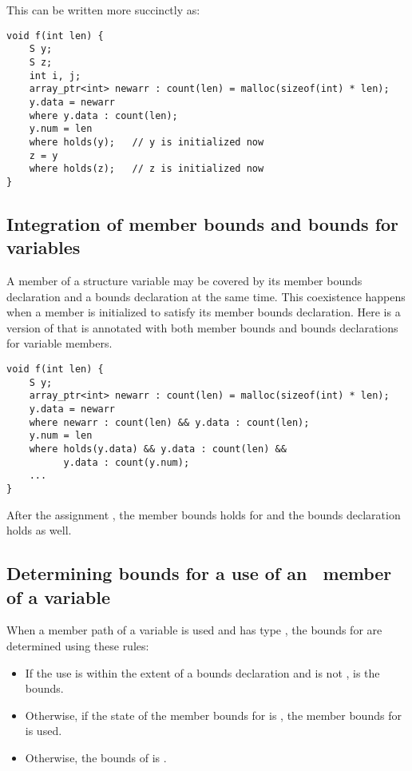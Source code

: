 This can be written more succinctly as:

\begin{lstlisting}
void f(int len) {
    S y;
    S z;
    int i, j;
    array_ptr<int> newarr : count(len) = malloc(sizeof(int) * len);
    y.data = newarr
    where y.data : count(len);
    y.num = len
    where holds(y);   // y is initialized now
    z = y
    where holds(z);   // z is initialized now
}
\end{lstlisting}

\subsection{Integration of member bounds and bounds for variables}

A member of a structure variable may be covered by its member bounds
declaration and a bounds declaration at the same time. This coexistence
happens when a member is initialized to satisfy its member bounds
declaration. Here is a version of  that is annotated with both member
bounds and bounds declarations for variable members.
\begin{lstlisting}
void f(int len) {
    S y;
    array_ptr<int> newarr : count(len) = malloc(sizeof(int) * len);
    y.data = newarr
    where newarr : count(len) && y.data : count(len);
    y.num = len
    where holds(y.data) && y.data : count(len) && 
          y.data : count(y.num);
    ...
}
\end{lstlisting}

After the assignment , the member bounds holds for
 and the bounds declaration 
holds as well.

\subsection{Determining bounds for a use of an \arrayptr\ member of a variable}
\label{section:determining-variable-member-bounds}

When a member path  of a variable  is used and
 has type \arrayptr, the bounds for
 are determined using these rules:

\begin{itemize}
\item
  If the use is within the extent of a bounds declaration
   \code{:}  and
   is not \boundsunknown,  is
  the bounds.
\item
  Otherwise, if the state of the member bounds for
   is , the member bounds for
   is used.
\item
  Otherwise, the bounds of  is
  \boundsunknown.
\end{itemize}

